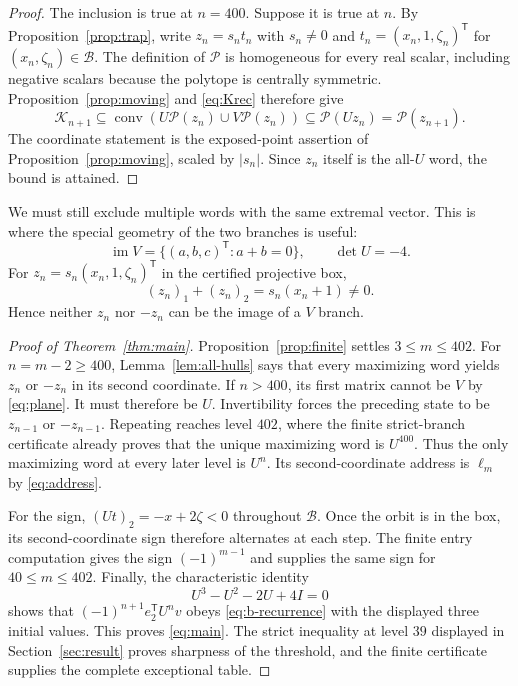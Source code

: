 \documentclass[11pt,a4paper]{article}
\theoremstyle{definition}\newtheorem{definition}[theorem]{Definition}
\theoremstyle{remark}\newtheorem{remark}[theorem]{Remark}
\newcommand{\conv}{\operatorname{conv}}
\newcommand{\tr}{\mathsf T}
\newcommand{\cB}{\mathcal B}
\newcommand{\cP}{\mathcal P}
\newcommand{\cK}{\mathcal K}
\begin{document}
\begin{proof}
The inclusion is true at $n=400$. Suppose it is true at $n$. By
Proposition~\ref{prop:trap}, write $z_n=s_nt_n$ with $s_n\ne0$ and
$t_n=(x_n,1,\zeta_n)^\tr$ for $(x_n,\zeta_n)\in\cB$.
The definition of $\cP$ is homogeneous for every real scalar, including
negative scalars because the polytope is centrally symmetric.
Proposition~\ref{prop:moving} and \eqref{eq:Krec} therefore give
\[
 \cK_{n+1}\subseteq
 \conv(U\cP(z_n)\cup V\cP(z_n))
 \subseteq\cP(Uz_n)=\cP(z_{n+1}).
\]
The coordinate statement is the exposed-point assertion of
Proposition~\ref{prop:moving}, scaled by $|s_n|$.
Since $z_n$ itself is the all-$U$ word, the bound is attained.
\end{proof}

We must still exclude multiple words with the same extremal vector. This is
where the special geometry of the two branches is useful:
\begin{equation}
 \operatorname{im}V=\{(a,b,c)^\tr:a+b=0\},\qquad \det U=-4.
 \label{eq:plane}
\end{equation}
For $z_n=s_n(x_n,1,\zeta_n)^\tr$ in the certified projective box,
\[
 (z_n)_1+(z_n)_2=s_n(x_n+1)\ne0.
\]
Hence neither $z_n$ nor $-z_n$ can be the image of a $V$ branch.

\begin{proof}[Proof of Theorem~\ref{thm:main}]
Proposition~\ref{prop:finite} settles $3\le m\le402$.
For $n=m-2\ge400$, Lemma~\ref{lem:all-hulls} says that every maximizing
word yields $z_n$ or $-z_n$ in its second coordinate. If $n>400$, its first
matrix cannot be $V$ by \eqref{eq:plane}. It must therefore be $U$.
Invertibility forces the preceding state to be $z_{n-1}$ or $-z_{n-1}$.
Repeating reaches level $402$, where the finite strict-branch certificate
already proves that the unique maximizing word is $U^{400}$.
Thus the only maximizing word at every later level is $U^n$.
Its second-coordinate address is $\ell_m$ by \eqref{eq:address}.

For the sign, $(Ut)_2=-x+2\zeta<0$ throughout $\cB$. Once the orbit is
in the box, its second-coordinate sign therefore alternates at each step.
The finite entry computation gives the sign $(-1)^{m-1}$ and supplies the
same sign for $40\le m\le402$.
Finally, the characteristic identity
\[
 U^3-U^2-2U+4I=0
\]
shows that $(-1)^{n+1}e_2^\tr U^n v$ obeys
\eqref{eq:b-recurrence} with the displayed three initial values.
This proves \eqref{eq:main}.
The strict inequality at level $39$ displayed in Section~\ref{sec:result}
proves sharpness of the threshold, and the finite certificate supplies the
complete exceptional table.
\end{proof}
\end{document}
